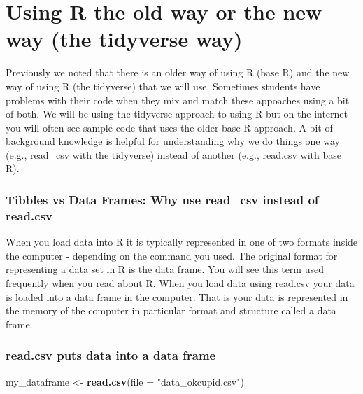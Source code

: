 \documentclass[
]{krantz}
\makeatletter
\newenvironment{Shaded}{\begin{snugshade}}{\end{snugshade}}
\newcommand{\DataTypeTok}[1]{\textcolor[rgb]{0.27,0.27,0.27}{#1}}
\newcommand{\KeywordTok}[1]{\textcolor[rgb]{0.27,0.27,0.27}{\textbf{#1}}}
\newcommand{\NormalTok}[1]{#1}
\newcommand{\StringTok}[1]{\textcolor[rgb]{0.5,0.5,0.5}{#1}}
\newenvironment{kframe}{%
\medskip{}
\setlength{\fboxsep}{.8em}
 \def\at@end@of@kframe{}%
 \ifinner\ifhmode%
  \def\at@end@of@kframe{\end{minipage}}%
  \begin{minipage}{\columnwidth}%
 \fi\fi%
 \def\FrameCommand##1{\hskip\@totalleftmargin \hskip-\fboxsep
 \colorbox{shadecolor}{##1}\hskip-\fboxsep
     \hskip-\linewidth \hskip-\@totalleftmargin \hskip\columnwidth}%
 \MakeFramed {\advance\hsize-\width
   \@totalleftmargin\z@ \linewidth\hsize
   \@setminipage}}%
 {\par\unskip\endMakeFramed%
 \at@end@of@kframe}
\renewenvironment{Shaded}{\begin{kframe}}{\end{kframe}}
\makeatother
\begin{document}
\hypertarget{using-r-the-old-way-or-the-new-way-the-tidyverse-way}{%
\section{Using R the old way or the new way (the tidyverse way)}\label{using-r-the-old-way-or-the-new-way-the-tidyverse-way}}

Previously we noted that there is an older way of using R (base R) and the new way of using R (the tidyverse) that we will use. Sometimes students have problems with their code when they mix and match these appoaches using a bit of both. We will be using the tidyverse approach to using R but on the internet you will often see sample code that uses the older base R approach. A bit of background knowledge is helpful for understanding why we do things one way (e.g., read\_csv with the tidyverse) instead of another (e.g., read.csv with base R).

\hypertarget{tibbles-vs-data-frames-why-use-read_csv-instead-of-read.csv}{%
\subsubsection{Tibbles vs Data Frames: Why use read\_csv instead of read.csv}\label{tibbles-vs-data-frames-why-use-read_csv-instead-of-read.csv}}

When you load data into R it is typically represented in one of two formats inside the computer - depending on the command you used. The original format for representing a data set in R is the data frame. You will see this term used frequently when you read about R. When you load data using read.csv your data is loaded into a data frame in the computer. That is your data is represented in the memory of the computer in particular format and structure called a data frame.

\hypertarget{read.csv-puts-data-into-a-data-frame}{%
\subsubsection{read.csv puts data into a data frame}\label{read.csv-puts-data-into-a-data-frame}}

\begin{Shaded}
\begin{Highlighting}[]
\NormalTok{my_dataframe <-}\StringTok{ }\KeywordTok{read.csv}\NormalTok{(}\DataTypeTok{file =} \StringTok{"data_okcupid.csv"}\NormalTok{)}
\end{Highlighting}
\end{Shaded}
\end{document}
